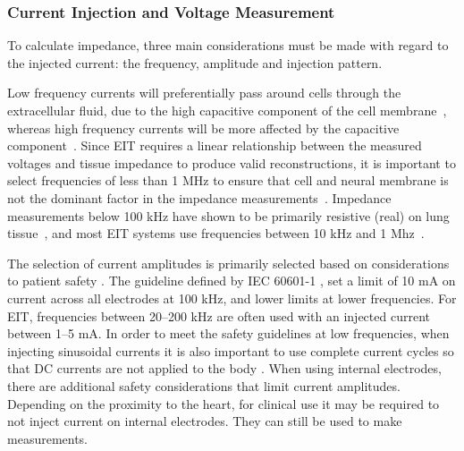 \subsubsection{Current Injection and Voltage Measurement}
To calculate impedance, three main considerations must be made with regard to the 
injected current: the frequency, amplitude and injection pattern. 

Low frequency currents will 
preferentially pass around cells through the extracellular
fluid, due to the high capacitive component of the cell 
membrane~\parencite{foster_whole-body_1996}, whereas high frequency currents will be 
more affected by the capacitive 
component~\parencite{holder_electrical_2004}. 
Since EIT requires a linear relationship between the measured voltages and 
tissue impedance to produce valid reconstructions,
it is important to select frequencies of less than 1 MHz to ensure that cell 
and neural membrane is not the dominant factor in the impedance 
measurements~\parencite{barber_applied_1984}.
Impedance measurements below 100 kHz have shown to be primarily resistive (real) on lung
tissue~\parencite{witsoe_electrical_1967}, and most EIT systems use
frequencies between 10 kHz and 1 Mhz~\parencite{holder_electrical_2004}.

The selection of current amplitudes is primarily selected based on 
considerations to patient safety \parencite{adler_electrical_2017}.
The guideline defined by IEC 60601-1 
\parencite{international_electrotechnical_commission_iec_2021}, set a limit 
of 10 mA on current across all electrodes at 100 kHz, and lower limits 
at lower frequencies. 
For EIT, frequencies between 20--200 kHz are often used with 
an injected current
between 1--5 mA.
In order to meet the safety
guidelines at low frequencies,
when injecting sinusoidal currents it is also important to use complete current cycles 
so that DC currents are not applied to the body \parencite{adler_electrical_2017}.
When using internal electrodes, there are additional safety considerations that limit
current amplitudes. Depending on the proximity to the heart, for clinical use 
it may be required to not inject current on internal electrodes. They can still be used
to make measurements. 

